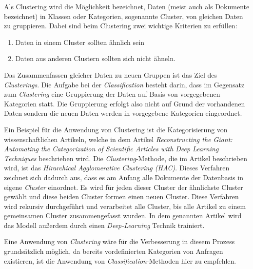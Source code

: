 Als Clustering wird die Möglichkeit bezeichnet,  Daten (meist auch als Dokumente bezeichnet) in Klassen oder Kategorien, sogenannte Cluster, von gleichen Daten zu gruppieren. Dabei sind beim Clustering zwei wichtige Kriterien zu erfüllen:

\begin{enumerate}
	\item Daten in einem Cluster sollten ähnlich sein
	\item Daten aus anderen Clustern sollten sich nicht ähneln.
\end{enumerate}
Das Zusammenfassen gleicher Daten zu neuen Gruppen ist das Ziel des \textit{Clusterings}. Die Aufgabe bei der \textit{Classification} besteht darin, dass im Gegensatz zum \textit{Clustering} eine Gruppierung der Daten auf Basis von vorgegebenen Kategorien statt. Die Gruppierung erfolgt also nicht auf Grund der vorhandenen Daten sondern die neuen Daten werden in vorgegebene Kategorien eingeordnet.

Ein Beispiel für die Anwendung von Clustering ist die Kategorisierung von wissenschaftlichen Artikeln, welche in dem Artikel \textit{Reconstructing the Giant: Automating the Categorization of Scientific Articles with Deep Learning Techniques} \cite{DannReconstructing} beschrieben wird. Die \textit{Clustering}-Methode, die im Artikel beschrieben wird, ist das \textit{Hirarchical Agglomerative Clustering (HAC)}. Dieses Verfahren zeichnet sich dadurch aus, dass es am Anfang alle Dokumente der Datenbasis in eigene \textit{Cluster} einordnet. Es wird für jeden dieser Cluster der ähnlichste Cluster gewählt und diese beiden Cluster formen einen neuen Cluster. Diese Verfahren wird rekursiv durchgeführt und verarbeitet alle Cluster, bis alle Artikel zu einem gemeinsamen Cluster zusammengefasst wurden. In dem genannten Artikel wird das Modell außerdem durch einen \textit{Deep-Learning} Technik trainiert. 

Eine Anwendung von \textit{Clustering} wäre für die Verbesserung in diesem Prozess grundsätzlich möglich, da bereits vordefinierten Kategorien von Anfragen existieren, ist die Anwendung von \textit{Classification}-Methoden hier zu empfehlen. 

